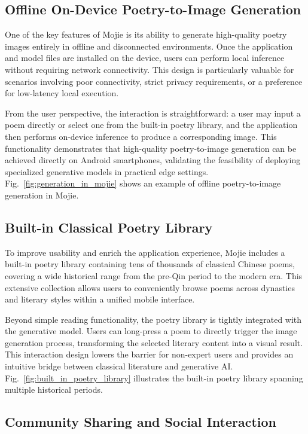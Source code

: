 \subsection{Offline On-Device Poetry-to-Image Generation}

One of the key features of Mojie is its ability to generate high-quality poetry images entirely in offline and disconnected environments. Once the application and model files are installed on the device, users can perform local inference without requiring network connectivity. This design is particularly valuable for scenarios involving poor connectivity, strict privacy requirements, or a preference for low-latency local execution.

From the user perspective, the interaction is straightforward: a user may input a poem directly or select one from the built-in poetry library, and the application then performs on-device inference to produce a corresponding image. This functionality demonstrates that high-quality poetry-to-image generation can be achieved directly on Android smartphones, validating the feasibility of deploying specialized generative models in practical edge settings. Fig.~\ref{fig:generation_in_mojie} shows an example of offline poetry-to-image generation in Mojie.

\subsection{Built-in Classical Poetry Library}

To improve usability and enrich the application experience, Mojie includes a built-in poetry library containing tens of thousands of classical Chinese poems, covering a wide historical range from the pre-Qin period to the modern era. This extensive collection allows users to conveniently browse poems across dynasties and literary styles within a unified mobile interface.

Beyond simple reading functionality, the poetry library is tightly integrated with the generative model. Users can long-press a poem to directly trigger the image generation process, transforming the selected literary content into a visual result. This interaction design lowers the barrier for non-expert users and provides an intuitive bridge between classical literature and generative AI. Fig.~\ref{fig:built_in_poetry_library} illustrates the built-in poetry library spanning multiple historical periods.

\subsection{Community Sharing and Social Interaction}


